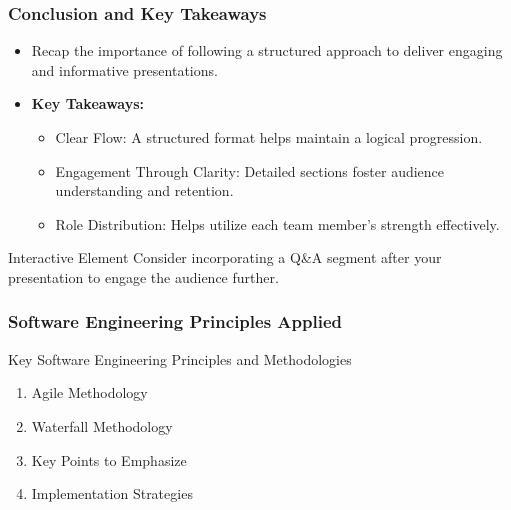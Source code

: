 \documentclass{beamer}
\begin{document}
\begin{frame}[fragile]
    \frametitle{Conclusion and Key Takeaways}
    \begin{itemize}
        \item Recap the importance of following a structured approach to deliver engaging and informative presentations.
        \item \textbf{Key Takeaways:} 
        \begin{itemize}
            \item Clear Flow: A structured format helps maintain a logical progression.
            \item Engagement Through Clarity: Detailed sections foster audience understanding and retention.
            \item Role Distribution: Helps utilize each team member’s strength effectively.
        \end{itemize}
    \end{itemize}
    \begin{block}{Interactive Element}
        Consider incorporating a Q\&A segment after your presentation to engage the audience further.
    \end{block}
\end{frame}

\begin{frame}[fragile]
    \frametitle{Software Engineering Principles Applied}
    \begin{block}{Key Software Engineering Principles and Methodologies}
        \begin{enumerate}
            \item Agile Methodology
            \item Waterfall Methodology
            \item Key Points to Emphasize
            \item Implementation Strategies
        \end{enumerate}
    \end{block}
\end{frame}
\end{document}
